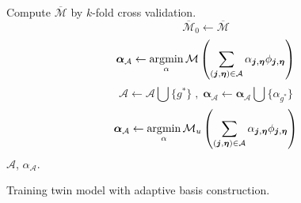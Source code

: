 \begin{algorithm}
\begin{algorithmic}[1]
\STATE Compute $\overline{\mathcal{M}}$ by $k$-fold cross validation.
\STATE $$\overline{\mathcal{M}}_0 \leftarrow \overline{\mathcal{M}}$$
       $$
           \boldsymbol{\alpha}_{\mathcal{A}} \leftarrow 
           \operatorname*{\arg\!\min}_{\alpha} \mathcal{M}\left(\sum_{(\boldsymbol{j}, \boldsymbol{\eta}) 
           \in \mathcal{A}} \alpha_{\boldsymbol{j}, \boldsymbol{\eta}} 
           \phi_{\boldsymbol{j}, \boldsymbol{\eta}}\right)
       $$
\ELSE \STATE
       $$\mathcal{A} \leftarrow \mathcal{A}\bigcup \{g^*\} \;,\;
       \boldsymbol{\alpha}_{\mathcal{A}} \leftarrow 
       \boldsymbol{\alpha}_{\mathcal{A}}\bigcup \{\alpha_{g^*}\}$$
\ENDIF
\ENDIF
\ENDLOOP
\STATE
       $$
           \boldsymbol{\alpha}_{\mathcal{A}} \leftarrow \operatorname*{\arg\!\min}_{\alpha} \mathcal{M}_u
           \left(\sum_{(\boldsymbol{j}, \boldsymbol{\eta}) \in \mathcal{A}} 
           \alpha_{\boldsymbol{j}, \boldsymbol{\eta}} 
           \phi_{\boldsymbol{j}, \boldsymbol{\eta}}\right)
       $$
\ENSURE $\mathcal{A}$, $\alpha_{\mathcal{A}}$.
\end{algorithmic}
\caption{Training twin model with adaptive basis construction.}
\label{alg: train twin}
\end{algorithm}



%
%


